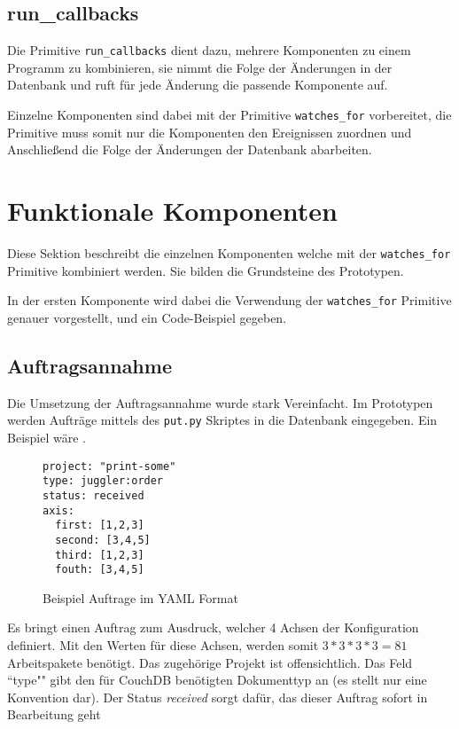 \subsection{run\_callbacks}

Die Primitive \verb|run_callbacks| dient dazu, mehrere Komponenten zu einem Programm
zu kombinieren, sie nimmt die Folge der Änderungen in der Datenbank und
ruft für jede Änderung die passende Komponente auf.

Einzelne Komponenten sind dabei mit der Primitive \verb|watches_for| vorbereitet,
die Primitive muss somit nur die Komponenten den Ereignissen zuordnen
und Anschließend die Folge der Änderungen der Datenbank abarbeiten.

\section{Funktionale Komponenten}

Diese Sektion beschreibt die einzelnen Komponenten welche mit der \verb|watches_for| Primitive kombiniert werden. Sie bilden die Grundsteine des Prototypen.

In der ersten Komponente wird dabei die Verwendung der \verb|watches_for| Primitive genauer vorgestellt, und ein Code-Beispiel gegeben.

\subsection{Auftragsannahme}

Die Umsetzung der Auftragsannahme wurde stark Vereinfacht.
Im Prototypen werden Aufträge mittels des \verb|put.py| Skriptes in die Datenbank eingegeben.
Ein Beispiel wäre .
\begin{figure}
\begin{verbatim}
project: "print-some"
type: juggler:order
status: received
axis:
  first: [1,2,3]
  second: [3,4,5]
  third: [1,2,3]
  fouth: [3,4,5]
\end{verbatim}
\caption{Beispiel Auftrage im YAML Format}
\label{fig:auftrag-beispieldaten}
\end{figure}

Es bringt einen Auftrag zum Ausdruck, welcher 4 Achsen der Konfiguration definiert.
Mit den Werten für diese Achsen, werden somit $3*3*3*3 = 81$ Arbeitspakete benötigt.
Das zugehörige Projekt ist offensichtlich. Das Feld ``type"" gibt den für CouchDB benötigten Dokumenttyp an (es stellt nur eine Konvention dar).
Der Status \textit{received} sorgt dafür, das dieser Auftrag sofort in Bearbeitung geht

